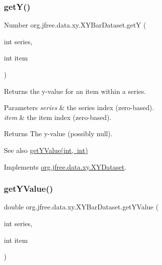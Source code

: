 \subsubsection{\texorpdfstring{get\+Y()}{getY()}}
{\footnotesize\ttfamily Number org.\+jfree.\+data.\+xy.\+X\+Y\+Bar\+Dataset.\+getY (\begin{DoxyParamCaption}\item[{int}]{series,  }\item[{int}]{item }\end{DoxyParamCaption})}

Returns the y-\/value for an item within a series.


\begin{DoxyParams}{Parameters}
{\em series} & the series index (zero-\/based). \\
\hline
{\em item} & the item index (zero-\/based).\\
\hline
\end{DoxyParams}
\begin{DoxyReturn}{Returns}
The y-\/value (possibly {\ttfamily null}).
\end{DoxyReturn}
\begin{DoxySeeAlso}{See also}
\mbox{\hyperlink{classorg_1_1jfree_1_1data_1_1xy_1_1_x_y_bar_dataset_ad5f518543e018a6bc34cfe303bc9fa69}{get\+Y\+Value(int, int)}} 
\end{DoxySeeAlso}


Implements \mbox{\hyperlink{interfaceorg_1_1jfree_1_1data_1_1xy_1_1_x_y_dataset_aa915867221e0f94021bad3140db5254e}{org.\+jfree.\+data.\+xy.\+X\+Y\+Dataset}}.

\mbox{\label{classorg_1_1jfree_1_1data_1_1xy_1_1_x_y_bar_dataset_ad5f518543e018a6bc34cfe303bc9fa69}} 
\subsubsection{\texorpdfstring{get\+Y\+Value()}{getYValue()}}
{\footnotesize\ttfamily double org.\+jfree.\+data.\+xy.\+X\+Y\+Bar\+Dataset.\+get\+Y\+Value (\begin{DoxyParamCaption}\item[{int}]{series,  }\item[{int}]{item }\end{DoxyParamCaption})}

